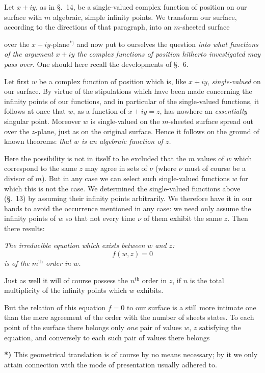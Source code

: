 \documentclass{article}
\begin{document}
Let $x + iy$, as in §.~14, be a single-valued complex function of position on our surface with $m$ algebraic, simple infinity points. We transform our surface, according to the directions of that paragraph, into an $m$-sheeted surface

over the $x + iy$-plane${}^{*)}$ and now put to ourselves the question \emph{into what functions of the argument $x + iy$ the complex functions of position hitherto investigated may pass over}. One should here recall the developments of §.~6.

Let first $w$ be a complex function of position which is, like $x + iy$, \emph{single-valued} on our surface. By virtue of the stipulations which have been made concerning the infinity points of our functions, and in particular of the single-valued functions, it follows at once that $w$, as a function of $x + iy = z$, has nowhere an \emph{essentially} singular point. Moreover $w$ is single-valued on the $m$-sheeted surface spread out over the $z$-plane, just as on the original surface. Hence it follows on the ground of known theorems: \emph{that $w$ is an algebraic function of $z$.}

Here the possibility is not in itself to be excluded that the $m$ values of $w$ which correspond to the same $z$ may agree in sets of $\nu$ (where $\nu$ must of course be a divisor of $m$). But in any case we can select such single-valued functions $w$ for which this is not the case. We determined the single-valued functions above (§.~13) by assuming their infinity points arbitrarily. We therefore have it in our hands to avoid the occurrence mentioned in any case: we need only assume the infinity points of $w$ so that not every time $\nu$ of them exhibit the same $z$. Then there results:

\emph{The irreducible equation which exists between $w$ and $z$:}
\[ f(w, z) = 0 \]
\emph{is of the $m^{\text{th}}$ order in $w$.}

Just as well it will of course possess the $n^{\text{th}}$ order in $z$, if $n$ is the total multiplicity of the infinity points which $w$ exhibits.

But the relation of this equation $f = 0$ to our surface is a still more intimate one than the mere agreement of the order with the number of sheets states. To each point of the surface there belongs only \emph{one} pair of values $w$, $z$ satisfying the equation, and conversely to each such pair of values there belongs

\textbf{*)} This geometrical translation is of course by no means necessary; by it we only attain connection with the mode of presentation usually adhered to.
\end{document}
